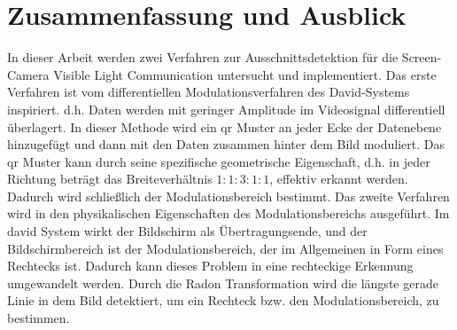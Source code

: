 \chapter{Zusammenfassung und Ausblick} 

In dieser Arbeit werden zwei Verfahren zur Ausschnittsdetektion für die Screen-Camera Visible Light Communication untersucht und implementiert. Das erste Verfahren ist vom differentiellen Modulationsverfahren des David-Systems inspiriert. d.h. Daten werden mit geringer Amplitude im Videosignal differentiell überlagert. In dieser Methode wird ein \gls{qr} Muster an jeder Ecke der Datenebene hinzugefügt und dann mit den Daten zusammen hinter dem Bild moduliert. Das \gls{qr} Muster kann durch seine spezifische geometrische Eigenschaft, d.h. in jeder Richtung beträgt das Breiteverhältnis $1:1:3:1:1$, effektiv erkannt werden. Dadurch wird schließlich der Modulationsbereich bestimmt. Das zweite Verfahren wird in den physikalischen Eigenschaften des Modulationsbereichs ausgeführt. Im \gls{david} System wirkt der Bildschirm als Übertragungsende, und der Bildschirmbereich ist der Modulationsbereich, der im Allgemeinen in Form eines Rechtecks ist. Dadurch kann dieses Problem in eine rechteckige Erkennung umgewandelt werden. Durch die Radon Transformation wird die längste gerade Linie in dem Bild detektiert, um ein Rechteck bzw. den Modulationsbereich, zu bestimmen.

